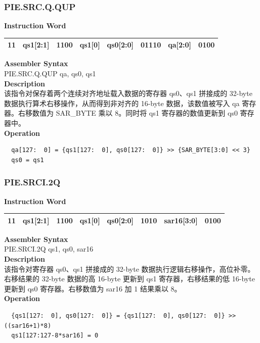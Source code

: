 \newpage
\subsubsection{PIE.SRC.Q.QUP}\label{instruction:PIESRCQQUP}
\setlength\tabcolsep{6pt}
\textbf{Instruction Word} \\
\begin{tabular}{|c|c|c|c|c|c|c|c|}
	\hline
	11 & qs1[2:1] & 1100 & qs1[0] & qs0[2:0] & 01110 & qa[2:0] & 0100 \\
	\hline
\end{tabular}

\textbf{Assembler Syntax} \\
PIE.SRC.Q.QUP qa, qs0, qs1 \\
\textbf{Description} \\
该指令对保存着两个连续对齐地址载入数据的寄存器 qs0、qs1 拼接成的 32-byte 数据执行算术右移操作，从而得到非对齐的 16-byte 数据，该数值被写入 qa 寄存器。右移数值为 SAR\_BYTE 乘以 8。同时将 qs1 寄存器的数值更新到 qs0 寄存器中。\\
\textbf{Operation}
\begin{lstlisting}
  qa[127:  0] = {qs1[127:  0], qs0[127:  0]} >> {SAR_BYTE[3:0] << 3}
  qs0 = qs1
\end{lstlisting}

\newpage
\subsubsection{PIE.SRCI.2Q}\label{instruction:PIESRCI2Q}
\setlength\tabcolsep{6pt}
\textbf{Instruction Word} \\
\begin{tabular}{|c|c|c|c|c|c|c|c|}
	\hline
	11 & qs1[2:1] & 1100 & qs1[0] & qs0[2:0] & 1010 & sar16[3:0] & 0100 \\
	\hline
\end{tabular}

\textbf{Assembler Syntax} \\
PIE.SRCI.2Q qs1, qs0, sar16 \\
\textbf{Description} \\
该指令对寄存器 qs0、qs1 拼接成的 32-byte 数据执行逻辑右移操作，高位补零。右移结果的 32-byte 数据的高 16-byte 更新到 qs1 寄存器，右移结果的低 16-byte 更新到 qs0 寄存器。右移数值为 sar16 加 1 结果乘以 8。\\
\textbf{Operation}
\begin{lstlisting}
  {qs1[127:  0], qs0[127:  0]} = {qs1[127:  0], qs0[127:  0]} >> ((sar16+1)*8)
  qs1[127:127-8*sar16] = 0
\end{lstlisting}

